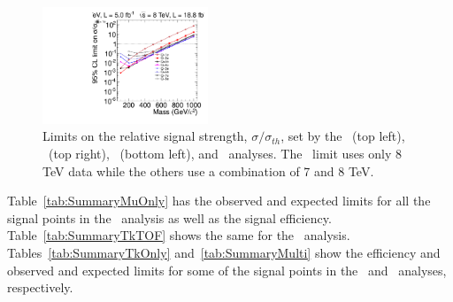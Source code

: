 \begin{figure}
  \includegraphics[clip=true, trim=0.0cm 0cm 2.8cm 0cm, width=0.44\textwidth]{figures/multi/HQExclusionRelLog}
\caption[Limits on the relative signal strength, $\sigma/\sigma_{th}$, set by the analyses]
{Limits on the relative signal strength, $\sigma/\sigma_{th}$,  set by the \muononly\ (top left), \tktof\ (top right), \tkonly\ (bottom left), and \multi\ analyses.
The \muononly\ limit uses only 8 TeV data while the others use a combination of 7 and 8 TeV.}
    \label{fig:RelExclusion}
\end{figure}

Table~\ref{tab:SummaryMuOnly} has the observed and expected limits for all the signal points in the \muononly\ analysis as well as the signal efficiency. 
Table~\ref{tab:SummaryTkTOF} shows the same for the \tktof\ analysis. Tables~\ref{tab:SummaryTkOnly} and~\ref{tab:SummaryMulti} show the efficiency
and observed and expected limits for some of the signal points in the \tkonly\ and \multi\ analyses, respectively.

